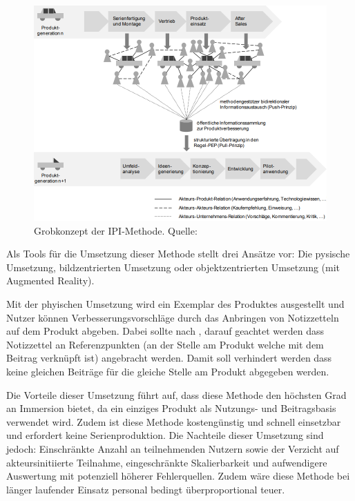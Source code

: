 \begin{figure}[H]
	\centering
	\includegraphics[width=1.0\textwidth]{resources/analyse/IPI_methode.png}
	\caption{Grobkonzept der IPI-Methode. Quelle:\cite[S.~128]{Kirschner2012}}
	\label{img:ipimethode}
\end{figure}

Als Tools für die Umsetzung dieser Methode stellt \citeauthor{Kirschner2012} drei Ansätze vor: Die pysische Umsetzung, bildzentrierten Umsetzung oder objektzentrierten Umsetzung (mit Augmented Reality). 

Mit der phyischen Umsetzung wird ein Exemplar des Produktes ausgestellt und Nutzer können Verbesserungsvorschläge durch das Anbringen von Notizzetteln auf dem Produkt abgeben. 
Dabei sollte nach \citeauthor{Kirschner2012}, darauf geachtet werden dass Notizzettel an Referenzpunkten (an der Stelle am Produkt welche mit dem Beitrag verknüpft ist) angebracht werden. Damit 
soll verhindert werden dass keine gleichen Beiträge für die gleiche Stelle am Produkt abgegeben werden. 

Die Vorteile dieser Umsetzung führt \citeauthor{Kirschner2012} auf, dass diese Methode den höchsten Grad an Immersion bietet, da ein einziges Produkt als  Nutzungs- und
Beitragsbasis verwendet wird. Zudem ist diese Methode kostengünstig und schnell einsetzbar und erfordert keine Serienproduktion. 
Die Nachteile dieser Umsetzung sind jedoch: Einschränkte Anzahl an teilnehmenden Nutzern sowie der Verzicht auf akteursinitiierte Teilnahme, eingeschränkte Skalierbarkeit und aufwendigere Auswertung mit potenziell 
höherer Fehlerquellen. Zudem wäre diese Methode bei länger laufender Einsatz personal bedingt überproportional teuer. \cite[S.~125]{Kirschner2012}

